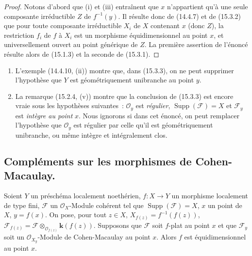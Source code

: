\begin{proof}
Notons d'abord que (i) et (iii) entraînent que $x$ n'appartient qu'à une seule
composante irréductible $Z$ de $f^{-1}(y)$. Il résulte donc de (14.4.7) et de
(15.3.2) que pour toute composante irréductible $X_i$ de $X$ contenant $x$
(donc $Z$), la restriction $f_i$ de $f$ à $X_i$ est un morphisme
équidimensionnel au point $x$, et universellement ouvert au point générique de
$Z$. La première assertion de l'énoncé résulte alors de (15.1.3) et la seconde
de (15.3.1).
\end{proof}

\begin{remarks}[15.3.4]
\label{IV.15.3.4-fr}
\begin{enumerate}[label=(\roman*)]
  \item L'exemple (14.4.10, (ii)) montre que, dans (15.3.3), on ne peut
  supprimer l'hypothèse que $Y$ est géométriquement unibranche au point $y$.
  \item La remarque (15.2.4, (v)) montre que la conclusion de (15.3.3) est
  encore vraie sous les hypothèses suivantes~: $\mathcal O_y$ est \emph{régulier},
  $\operatorname{Supp}(\mathcal F)=X$ et $\mathcal F_y$ est \emph{intègre au point}
  $x$. Nous ignorons si dans cet énoncé, on peut remplacer l'hypothèse que
  $\mathcal O_y$ est régulier par celle qu'il est géométriquement unibranche, ou
  même intègre et intégralement clos.
\end{enumerate}
\end{remarks}

\subsection{Compléments sur les morphismes de Cohen-Macaulay.}
\label{subsection:IV.15.4-fr}

\begin{proposition}[15.4.1]
\label{IV.15.4.1-fr}
Soient $Y$ un préschéma localement noethérien, $f:X\to Y$ un morphisme localement
de type fini, $\mathcal F$ un $\mathcal O_X$-Module cohérent tel que
$\operatorname{Supp}(\mathcal F)=X$, $x$ un point de $X$, $y=f(x)$. On pose,
pour tout $z\in X$, $X_{f(z)}=f^{-1}(f(z))$,
$\mathcal F_{f(z)}=\mathcal F\otimes_{\mathcal O_{f(z)}}\boldsymbol{k}(f(z))$.
Supposons que $\mathcal F$ soit $f$-plat au point $x$ et que $\mathcal F_y$ soit
un $\mathcal O_{X_y}$-Module de Cohen-Macaulay au point $x$. Alors $f$ est
équidimensionnel au point $x$.
\end{proposition}

